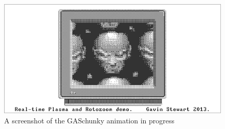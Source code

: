 \begin{center}
  \begin{figure}[h]
    \includegraphics[width=14cm]{fig/gaschunky.png}
    \caption{A screenshot of the GASchunky animation in progress}%
    \label{fig:gaschunky-screenshot}
  \end{figure}
\end{center}


